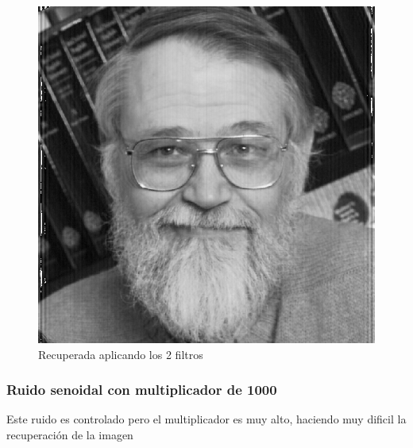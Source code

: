 \begin{figure}[H]
\begin {center}
\includegraphics[width=360pt]{imagenes/kern-sin50-recovered.png}
\end {center}
\caption{Recuperada aplicando los 2 filtros}
\label{fig:SinProm}
\end{figure}

\subsubsection{Ruido senoidal con multiplicador de 1000}

Este ruido es controlado pero el multiplicador es muy alto, haciendo muy dificil
la recuperaci\'on de la imagen

